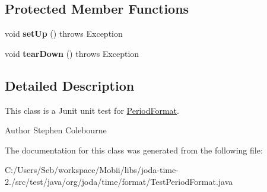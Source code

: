 \subsection*{Protected Member Functions}
\begin{DoxyCompactItemize}
\item 
\hypertarget{classorg_1_1joda_1_1time_1_1format_1_1_test_period_format_a199a2b42f1f937bf8012bc08e28b6ec2}{void {\bfseries set\-Up} ()  throws Exception }\label{classorg_1_1joda_1_1time_1_1format_1_1_test_period_format_a199a2b42f1f937bf8012bc08e28b6ec2}

\item 
\hypertarget{classorg_1_1joda_1_1time_1_1format_1_1_test_period_format_aa42e046492a10beaa7954c09c8a59d80}{void {\bfseries tear\-Down} ()  throws Exception }\label{classorg_1_1joda_1_1time_1_1format_1_1_test_period_format_aa42e046492a10beaa7954c09c8a59d80}

\end{DoxyCompactItemize}


\subsection{Detailed Description}
This class is a Junit unit test for \hyperlink{classorg_1_1joda_1_1time_1_1format_1_1_period_format}{Period\-Format}.

\begin{DoxyAuthor}{Author}
Stephen Colebourne 
\end{DoxyAuthor}


The documentation for this class was generated from the following file\-:\begin{DoxyCompactItemize}
\item 
C\-:/\-Users/\-Seb/workspace/\-Mobii/libs/joda-\/time-\/2./src/test/java/org/joda/time/format/Test\-Period\-Format.\-java\end{DoxyCompactItemize}
